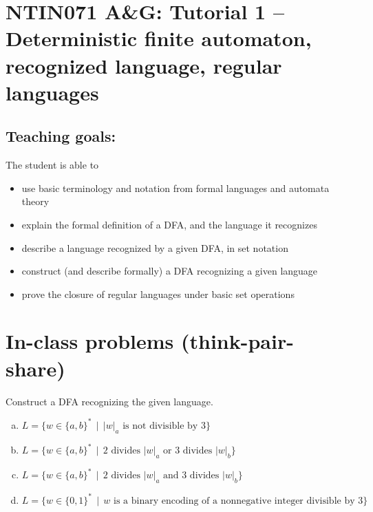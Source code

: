 \documentclass[a4paper,12pt]{amsart}
\begin{document}
\thispagestyle{empty}

\section*{NTIN071 A\&G: Tutorial 1 -- Deterministic finite automaton, recognized language, regular languages}

\medskip

\subsection*{Teaching goals:} The student is able to

    \begin{itemize}\setlength{\itemsep}{0pt}
        \item use basic terminology and notation from formal languages and automata theory
        \item explain the formal definition of a DFA, and the language it recognizes
        \item describe a language recognized by a given DFA, in set notation
        \item construct (and describe formally) a DFA recognizing a given language
        \item prove the closure of regular languages under basic set operations
    \end{itemize}


\section*{In-class problems (think-pair-share)}

\medskip

\medskip\begin{problem} 
    
    Construct a DFA recognizing the given language.

    \medskip
    
    \begin{enumerate}[(a)]\setlength\itemsep{6pt}        
        \item $L=\{w\in\{a,b\}^* \,\mid\, |w|_a \text{ is not divisible by 3}\}$
        \item $L=\{w\in\{a,b\}^* \,\mid\,\text{2 divides $|w|_a$ or 3 divides $|w|_b$}\}$ 
        \item $L=\{w\in\{a,b\}^* \,\mid\, \text{2 divides $|w|_a$ and 3 divides $|w|_b$}\}$
        \item $L=\{w\in\{0,1\}^* \,\mid\, w\text{ is a binary encoding of a nonnegative integer divisible by 3}\}$        
    \end{enumerate}

\end{problem}
\end{document}
